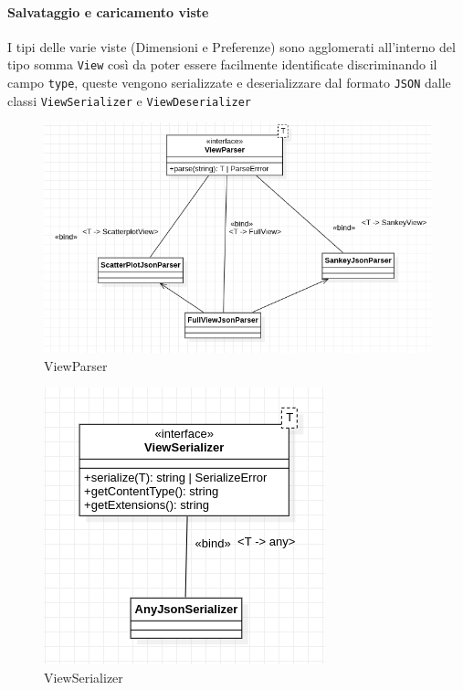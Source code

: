\paragraph{Salvataggio e caricamento viste}
I tipi delle varie viste (Dimensioni e Preferenze) sono agglomerati all'interno
del tipo somma \texttt{View} così da poter essere facilmente identificate
discriminando il campo \texttt{type}, queste vengono serializzate e
deserializzare dal formato \texttt{JSON} dalle classi \texttt{ViewSerializer} e
\texttt{ViewDeserializer}

\begin{figure}[h!]
  \centering
  \includegraphics[scale=0.55]{../../assets/classi_uml/viewparser.png}
  \caption{ViewParser}
\end{figure}

\begin{figure}[h!]
  \centering
  \includegraphics[scale=0.55]{../../assets/classi_uml/viewserializer.png}
  \caption{ViewSerializer}
\end{figure}

